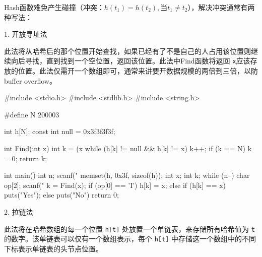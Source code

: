 Hash函数难免产生碰撞（冲突：$h(t_1) = h(t_2), \text{当} t_1 \neq t_2$），解决冲突通常有两种写法：

1. 开放寻址法

此法将从哈希后的那个位置开始查找，如果已经有了不是自己的人占用该位置则继续向后寻找，直到找到一个空位置，返回该位置。此法中Find函数将返回 \lstinline{x}应该存放的位置。此法仅需开一个数组即可，通常来讲要开数据规模的两倍到三倍，以防buffer overflow。

\begin{mycpptwocol}[开放寻址法]
    #include <stdio.h>
    #include <stdlib.h>
    #include <string.h>

    #define N 200003

    int h[N];
    const int null = 0x3f3f3f3f;

    int Find(int x)
        {
        int k = (x %
        while (h[k] != null && h[k] != x) {
            k++;
            if (k == N) {
                k = 0;
            }
        }
        return k;
    }

    int main()
        {
        int n;
        scanf("%
        memset(h, 0x3f, sizeof(h));
        int x;
        int k;
        while (n--) {
            char op[2];
            scanf("%
            k = Find(x);
            if (op[0] == 'I') {
                h[k] = x;
            } else {
                if (h[k] == x) {
                    puts("Yes");
                } else {
                    puts("No")
                }
            }
        }
        return 0;
    }
\end{mycpptwocol}

2. 拉链法

此法将在哈希数组的每一个位置 \lstinline{h[t]} 处放置一个单链表，来存储所有哈希值为 \lstinline{t} 的数字。该单链表可以仅有一个数组表示，每个 \lstinline{h[t]} 中存储这一个数组中的不同下标表示单链表的头节点位置。


